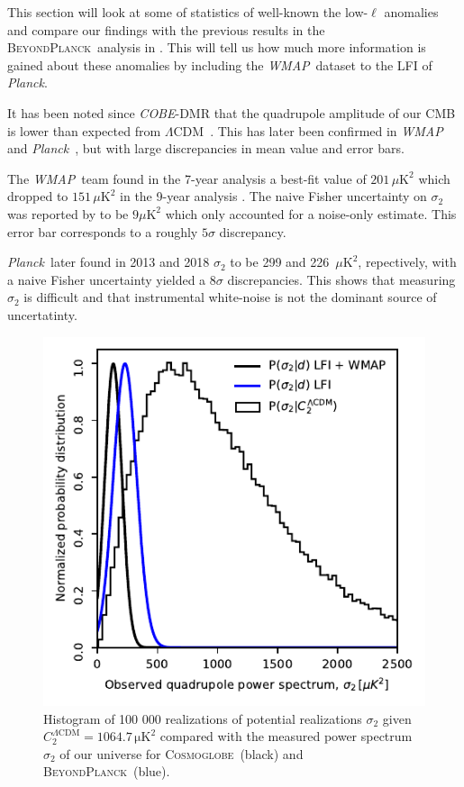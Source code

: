 \documentclass[twocolumn]{../../common/aa}
\def\WMAP{\emph{WMAP}}
\def\COBE{\emph{COBE}}
\def\wmap{\emph{WMAP}}
\def\planck{\emph{Planck}}
\def\Planck{\emph{Planck}}
\def\LCDM{$\Lambda$CDM}
\newcommand{\BP}{\textsc{BeyondPlanck}}
\newcommand{\bp}{\textsc{BeyondPlanck}}
\newcommand{\Cosmoglobe}{\textsc{Cosmoglobe}}
\begin{document}
This section will look at some of statistics of well-known the low-$\ell$ anomalies and compare our findings with the previous  results in the \bp\ analysis in \citet{bp11}. This will tell us how much more information is gained about these anomalies by including the \WMAP\ dataset to the LFI of \Planck.

It has been noted since \COBE-DMR that the quadrupole amplitude of our CMB is lower than expected from \LCDM\ \citep{bennett:1992}. This has later been confirmed in \wmap\ \citep{hinshaw2003a} and \planck\ \citep{planck2013-XV}, but with large discrepancies in mean value and error bars.

The \WMAP\ team found in the 7-year analysis a best-fit value of $201\,\mu\mathrm{K}^2$ \citep{larson2010} which dropped to $151\,\mu\mathrm{K}^2$ in the 9-year analysis \citep{hinshaw2012}. The naive Fisher uncertainty on $\sigma_2$ was reported by \citet{hinshaw2012} to be $9\mu \mathrm{K}^2$ which only accounted for a noise-only estimate. This error bar corresponds to a roughly $5\sigma$ discrepancy.

\Planck\ later found in 2013 and 2018 $\sigma_2$ to be 299 and 226~$\mu \mathrm{K}^2$, repectively, with a naive Fisher uncertainty yielded a $8\sigma$ discrepancies. This shows that measuring $\sigma_2$ is difficult and that instrumental white-noise is not the dominant source of uncertatinty.

\begin{figure}
	\includegraphics[width=\columnwidth]{figures/WMAP_P_sig_d_c.pdf}
	\caption{Histogram of 100 000 realizations of potential realizations $\sigma_2$ given ${C_2^{\Lambda \mathrm{CDM}} = 1064.7\,\mathrm{\mu K^2}}$ compared with the measured power spectrum $\sigma_2$ of our universe for \Cosmoglobe\ (black) and \BP\ (blue).}
	\label{fig:sigma_2_hist}
\end{figure}
\end{document}
